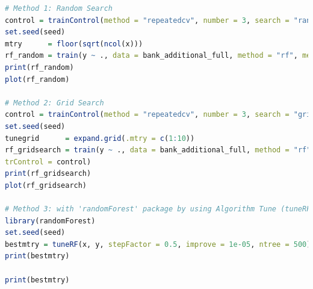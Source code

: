 \documentclass[12pt, a4paper, bibliography=totoc, english]{scrartcl}
\begin{document}
\begin{lstlisting}[language = R]
# Method 1: Random Search
control = trainControl(method = "repeatedcv", number = 3, search = "random")
set.seed(seed)
mtry      = floor(sqrt(ncol(x)))
rf_random = train(y ~ ., data = bank_additional_full, method = "rf", metric = "Accuracy", tuneLength = 15, trControl = control)
print(rf_random)
plot(rf_random)

# Method 2: Grid Search
control = trainControl(method = "repeatedcv", number = 3, search = "grid")
set.seed(seed)
tunegrid      = expand.grid(.mtry = c(1:10))
rf_gridsearch = train(y ~ ., data = bank_additional_full, method = "rf", metric = "Accuracy", tuneGrid = tunegrid, 
trControl = control)
print(rf_gridsearch)
plot(rf_gridsearch)

# Method 3: with 'randomForest' package by using Algorithm Tune (tuneRF)
library(randomForest)
set.seed(seed)
bestmtry = tuneRF(x, y, stepFactor = 0.5, improve = 1e-05, ntree = 500)
print(bestmtry)

print(bestmtry)
\end{lstlisting}
\end{document}
